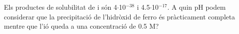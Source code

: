\begin{exr}{}
Els productes de solubilitat de  i  són 4$\cdot$10$^{-38}$ i 4.5$\cdot$10$^{-17}$. A quin pH podem considerar que la precipitació de l'hidròxid de ferro és pràcticament completa mentre que l'ió  queda a una concentració de 0.5 M?
\end{exr}
